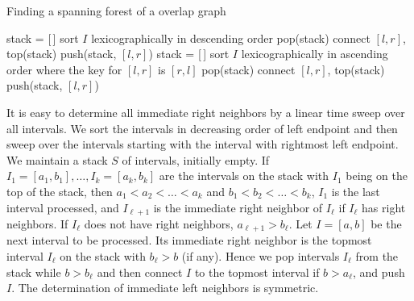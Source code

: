 \documentclass[paper=a4]{scrartcl}
\begin{document}
\begin{algorithm}[t]
\caption{Finding a spanning forest of a overlap graph}
\label{alg:spanning_tree}
\begin{algorithmic}
	\State stack = [\,]
	\State sort $I$ lexicographically in descending order
	    \State pop(stack)
	  \EndWhile
	    \State connect $[l,r]$, top(stack)
	  \EndIf
	  \State push(stack, $[l,r]$)
	\EndFor
	\State stack = [\,]
	\State sort $I$ lexicographically in ascending order where the key for $[l,r]$ is $[r,l]$
	    \State pop(stack)
	  \EndWhile
	    \State connect $[l,r]$, top(stack)
	  \EndIf
	  \State push(stack, $[l,r]$)
	\EndFor
	\EndProcedure
\end{algorithmic}
\end{algorithm}

It is easy to determine all immediate right neighbors by a linear time sweep over all intervals. We sort the intervals in decreasing order of left endpoint and then sweep over the intervals starting with the interval with rightmost left endpoint. We maintain a stack $S$ of intervals, initially empty. If $I_1 = [a_1,b_1],\ldots,I_k=[a_k,b_k]$ are the intervals on the stack with $I_1$ being on the top of the stack, then $a_1 < a_2 < \ldots < a_k$ and $b_1 <b_2 < \ldots < b_k$, $I_1$ is the last interval processed, and $I_{\ell+1}$ is the immediate right neighbor of $I_\ell$ if $I_\ell$ has right neighbors. If $I_\ell$ does not have right neighbors, $a_{\ell +1} > b_{\ell}$. Let $I = [a,b]$ be the next interval to be processed. Its immediate right neighbor is the topmost interval $I_\ell$ on the stack with $b_\ell > b$ (if any). Hence we pop intervals $I_\ell$ from the stack while $b>b_\ell$ and then connect $I$ to the topmost interval if $b>a_\ell$, and push $I$. The determination of immediate left neighbors is symmetric.
\end{document}
